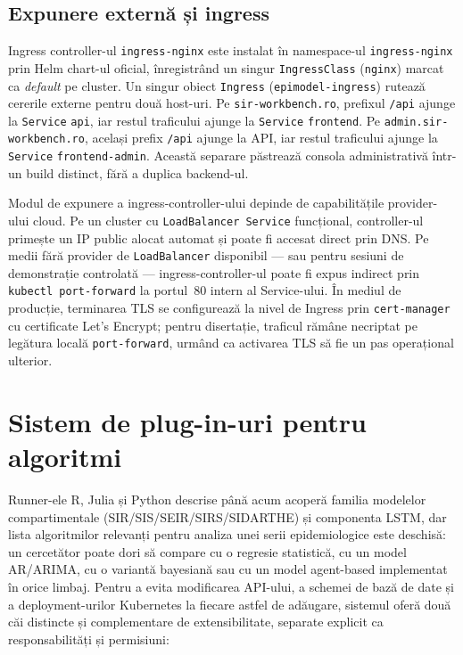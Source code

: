 \subsection{Expunere externă și ingress}
\label{subsec:ingress}

Ingress controller-ul \texttt{ingress-nginx} este instalat în namespace-ul
\texttt{ingress-nginx} prin Helm chart-ul oficial, înregistrând un singur
\texttt{IngressClass} (\texttt{nginx}) marcat ca \emph{default} pe cluster.
Un singur obiect \texttt{Ingress} (\texttt{epimodel-ingress}) rutează
cererile externe pentru două host-uri. Pe \texttt{sir-workbench.ro}, prefixul
\texttt{/api} ajunge la \texttt{Service} \texttt{api}, iar restul traficului
ajunge la \texttt{Service} \texttt{frontend}. Pe \texttt{admin.sir-workbench.ro},
același prefix \texttt{/api} ajunge la API, iar restul traficului ajunge la
\texttt{Service} \texttt{frontend-admin}. Această separare păstrează consola
administrativă într-un build distinct, fără a duplica backend-ul.

Modul de expunere a ingress-controller-ului depinde de capabilitățile
provider-ului cloud. Pe un cluster cu \texttt{LoadBalancer Service}
funcțional, controller-ul primește un IP public alocat automat și
poate fi accesat direct prin DNS. Pe medii fără provider de \texttt{LoadBalancer}
disponibil --- sau pentru sesiuni de demonstrație controlată --- ingress-controller-ul
poate fi expus indirect prin \texttt{kubectl port-forward} la portul~80
intern al Service-ului. În mediul de producție, terminarea TLS se
configurează la nivel de Ingress prin \texttt{cert-manager} cu certificate
Let's Encrypt; pentru disertație, traficul rămâne necriptat pe legătura
locală \texttt{port-forward}, urmând ca activarea TLS să fie un pas
operațional ulterior.

\section{Sistem de plug-in-uri pentru algoritmi}
\label{sec:plugin_runners}

Runner-ele R, Julia și Python descrise până acum acoperă familia modelelor
compartimentale (SIR/SIS/SEIR/SIRS/SIDARTHE) și componenta LSTM, dar lista
algoritmilor relevanți pentru analiza unei serii epidemiologice este
deschisă: un cercetător poate dori să compare cu o regresie statistică, cu
un model AR/ARIMA, cu o variantă bayesiană sau cu un model agent-based
implementat în orice limbaj. Pentru a evita modificarea API-ului, a schemei
de bază de date și a deployment-urilor Kubernetes la fiecare astfel de
adăugare, sistemul oferă două căi distincte și complementare de
extensibilitate, separate explicit ca responsabilități și permisiuni:

